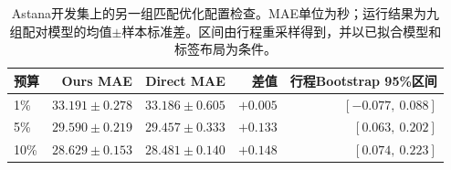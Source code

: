 \begin{table}[t]
\centering\small\setlength{\tabcolsep}{6pt}
\caption{Astana开发集上的另一组匹配优化配置检查。MAE单位为秒；运行结果为九组配对模型的均值$\pm$样本标准差。区间由行程重采样得到，并以已拟合模型和标签布局为条件。}\label{tab:performance-confirmation}
\begin{tabular}{lrrrr}\toprule
预算 & Ours MAE & Direct MAE & 差值 & 行程Bootstrap 95\%区间\\\midrule
1\% & $33.191\pm0.278$ & $33.186\pm0.605$ & $+0.005$ & $[-0.077,\ 0.088]$\\
5\% & $29.590\pm0.219$ & $29.457\pm0.333$ & $+0.133$ & $[0.063,\ 0.202]$\\
10\% & $28.629\pm0.153$ & $28.481\pm0.140$ & $+0.148$ & $[0.074,\ 0.223]$\\
\bottomrule\end{tabular}
\end{table}
